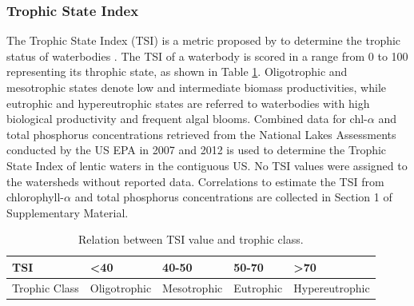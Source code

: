 \documentclass[authoryear]{elsarticle}
\begin{document}
\subsubsection{Trophic State Index}
The Trophic State Index (TSI) is a metric proposed by \citet{carlson_trophic_1977}
to determine the trophic status of waterbodies \citep{QAPP2012}. The TSI of a waterbody is scored in a range from 0 to 100 representing its throphic state, as shown in Table \ref{table:TSI_relation}. Oligotrophic and mesotrophic states denote low and intermediate biomass productivities, while eutrophic and hypereutrophic states are referred to waterbodies with high biological productivity and frequent algal blooms. Combined data for chl-$\alpha$ and total phosphorus concentrations retrieved from the National Lakes Assessments
conducted by the US EPA in 2007 and 2012 \citep{NLA2012, NLA2007} is used to determine the Trophic State Index of lentic waters in the contiguous US. No TSI values were assigned to the watersheds without reported data. Correlations to estimate the TSI from chlorophyll-$\alpha$ and total phosphorus concentrations are collected in Section 1 of Supplementary Material.

\begin{table}[H]
	\centering
	\caption{Relation between TSI value and trophic class.}
	\label{table:TSI_relation}
	\begin{tabular}{@{}lllll@{}}
		\toprule
		{TSI}           & \textless 40 & 40-50       & 50-70     & \textgreater{}70 \\ \midrule
		{Trophic Class} & Oligotrophic & Mesotrophic & Eutrophic & Hypereutrophic   \\ \bottomrule
	\end{tabular}
\end{table}
\end{document}
